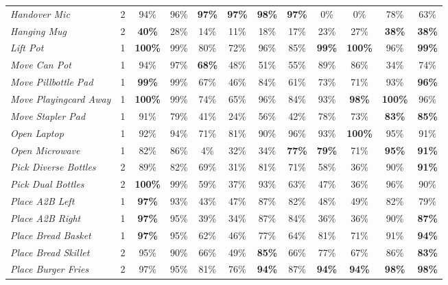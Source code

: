 \documentclass[onecolumn]{robbyant}           %
\begin{document}
\begin{table}[t]
{\begin{tabular}{l c cc cc cc cc cc}
\textit{Handover Mic} & 2 & 94\% & 96\% & \textbf{97\%} & \textbf{97\%} & \textbf{98\%} & \textbf{97\%} & 0\% & 0\% & 78\% & 63\% \\
\textit{Hanging Mug} & 2 & \textbf{40\%} & 28\% & 14\% & 11\% & 18\% & 17\% & 23\% & 27\% & \textbf{38\%} & \textbf{38\%} \\
\textit{Lift Pot} & 1 & \textbf{100\%} & 99\% & 80\% & 72\% & 96\% & 85\% & \textbf{99\%} & \textbf{100\%} & 96\% & \textbf{99\%} \\
\textit{Move Can Pot} & 1 & 94\% & 97\% & \textbf{68\%} & 48\% & 51\% & 55\% & 89\% & 86\% & 34\% & 74\% \\
\textit{Move Pillbottle Pad} & 1 & \textbf{99\%} & 99\% & 67\% & 46\% & 84\% & 61\% & 73\% & 71\% & 93\% & \textbf{96\%} \\
\textit{Move Playingcard Away} & 1 & \textbf{100\%} & 99\% & 74\% & 65\% & 96\% & 84\% & 93\% & \textbf{98\%} & \textbf{100\%} & 96\% \\
\textit{Move Stapler Pad} & 1 & 91\% & 79\% & 41\% & 24\% & 56\% & 42\% & 78\% & 73\% & \textbf{83\%} & \textbf{85\%} \\
\textit{Open Laptop} & 1 & 92\% & 94\% & 71\% & 81\% & 90\% & 96\% & 93\% & \textbf{100\%} & 95\% & 91\% \\
\textit{Open Microwave} & 1 & 82\% & 86\% & 4\% & 32\% & 34\% & \textbf{77\%} & \textbf{79\%} & 71\% & \textbf{95\%} & \textbf{91\%} \\
\textit{Pick Diverse Bottles} & 2 & 89\% & 82\% & 69\% & 31\% & 81\% & 71\% & 58\% & 36\% & 90\% & \textbf{91\%} \\
\textit{Pick Dual Bottles} & 2 & \textbf{100\%} & 99\% & 59\% & 37\% & 93\% & 63\% & 47\% & 36\% & 96\% & 90\% \\
\textit{Place A2B Left} & 1 & \textbf{97\%} & 93\% & 43\% & 47\% & 87\% & 82\% & 48\% & 49\% & 82\% & 79\% \\
\textit{Place A2B Right} & 1 & \textbf{97\%} & 95\% & 39\% & 34\% & 87\% & 84\% & 36\% & 36\% & 90\% & \textbf{87\%} \\
\textit{Place Bread Basket} & 1 & \textbf{97\%} & 95\% & 62\% & 46\% & 77\% & 64\% & 81\% & 71\% & 91\% & \textbf{94\%} \\
\textit{Place Bread Skillet} & 2 & 95\% & 90\% & 66\% & 49\% & \textbf{85\%} & 66\% & 77\% & 67\% & 86\% & \textbf{83\%} \\
\textit{Place Burger Fries} & 2 & 97\% & 95\% & 81\% & 76\% & \textbf{94\%} & 87\% & \textbf{94\%} & \textbf{94\%} & \textbf{98\%} & \textbf{98\%} \\

\end{tabular}}
\end{table}
\end{document}
